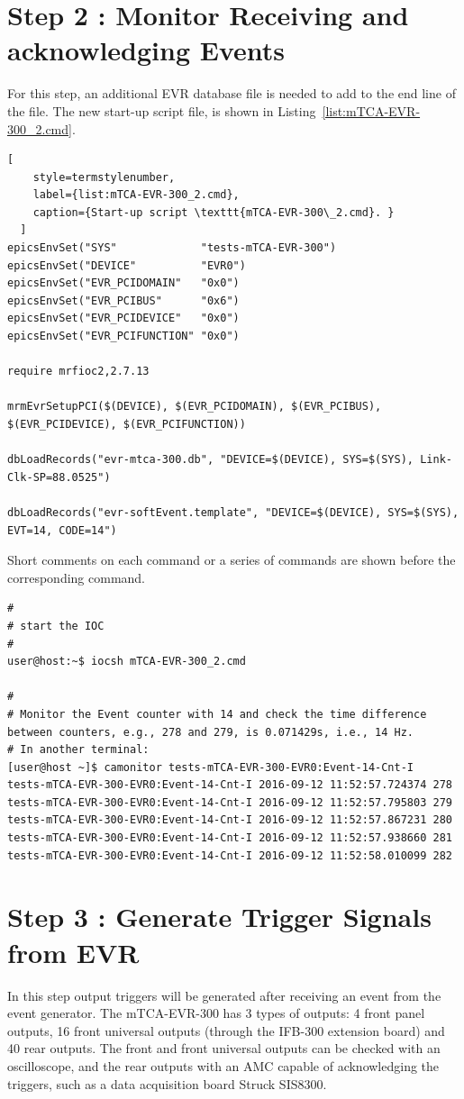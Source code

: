 \documentclass[11pt
  , a4paper
  , article
  , oneside
  , showtrims
]{memoir}
\begin{document}
\section{Step 2 : Monitor Receiving and acknowledging Events}
For this step, an additional EVR database file is needed to add to the end line of the  file. The new start-up script file,  is shown in Listing~\ref{list:mTCA-EVR-300_2.cmd}. 
\begin{lstlisting}[
    style=termstylenumber,
    label={list:mTCA-EVR-300_2.cmd},
    caption={Start-up script \texttt{mTCA-EVR-300\_2.cmd}. }
  ]
epicsEnvSet("SYS"             "tests-mTCA-EVR-300")
epicsEnvSet("DEVICE"          "EVR0")
epicsEnvSet("EVR_PCIDOMAIN"   "0x0")
epicsEnvSet("EVR_PCIBUS"      "0x6")
epicsEnvSet("EVR_PCIDEVICE"   "0x0")
epicsEnvSet("EVR_PCIFUNCTION" "0x0")

require mrfioc2,2.7.13

mrmEvrSetupPCI($(DEVICE), $(EVR_PCIDOMAIN), $(EVR_PCIBUS), $(EVR_PCIDEVICE), $(EVR_PCIFUNCTION))

dbLoadRecords("evr-mtca-300.db", "DEVICE=$(DEVICE), SYS=$(SYS), Link-Clk-SP=88.0525")

dbLoadRecords("evr-softEvent.template", "DEVICE=$(DEVICE), SYS=$(SYS), EVT=14, CODE=14")
\end{lstlisting}

Short comments on each command or a series of commands are shown before the corresponding command.

\begin{lstlisting}[style=termstylenumber]
#
# start the IOC
#
user@host:~$ iocsh mTCA-EVR-300_2.cmd

#
# Monitor the Event counter with 14 and check the time difference between counters, e.g., 278 and 279, is 0.071429s, i.e., 14 Hz.
# In another terminal:
[user@host ~]$ camonitor tests-mTCA-EVR-300-EVR0:Event-14-Cnt-I
tests-mTCA-EVR-300-EVR0:Event-14-Cnt-I 2016-09-12 11:52:57.724374 278  
tests-mTCA-EVR-300-EVR0:Event-14-Cnt-I 2016-09-12 11:52:57.795803 279  
tests-mTCA-EVR-300-EVR0:Event-14-Cnt-I 2016-09-12 11:52:57.867231 280  
tests-mTCA-EVR-300-EVR0:Event-14-Cnt-I 2016-09-12 11:52:57.938660 281  
tests-mTCA-EVR-300-EVR0:Event-14-Cnt-I 2016-09-12 11:52:58.010099 282
\end{lstlisting}


\section{Step 3 : Generate Trigger Signals from EVR}
In this step output triggers will be generated after receiving an event from the event generator. The mTCA-EVR-300 has 3 types of outputs: 4 front panel outputs, 16 front universal outputs (through the IFB-300 extension board) and 40 rear outputs. The front and front universal outputs can be checked with an oscilloscope, and the rear outputs with an AMC capable of acknowledging the triggers, such as a data acquisition board Struck SIS8300.
\end{document}
